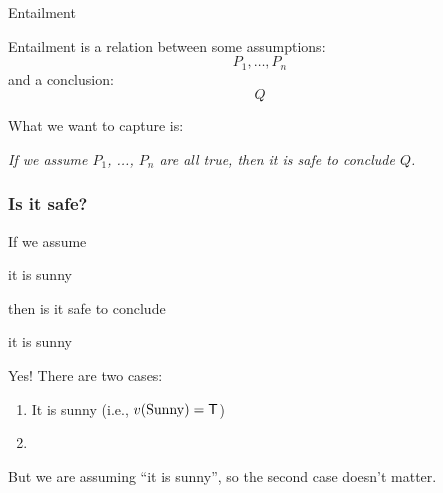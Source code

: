 \documentclass[xetex,aspectratio=169,14pt,hyperref={pdfpagelabels=true,pdflang={en-GB}}]{beamer}
\begin{document}
\frame{\titlepage}


\begin{frame}
  {Entailment}

  Entailment is a relation between some assumptions:
  \begin{displaymath}
    P_1, \dots, P_n
  \end{displaymath}
  and a conclusion:
  \begin{displaymath}
    Q
  \end{displaymath}

  \pause
  \bigskip

  What we want to capture is:

  \medskip

  \qquad \emph{If we assume $P_1$, ..., $P_n$ are all true, then it is safe to conclude $Q$.}


\end{frame}

\begin{frame}[t]
  \frametitle{Is it safe?}

  If we assume
  \begin{center}
    it is sunny
  \end{center}
  then is it safe to conclude
  \begin{center}
    it is sunny
  \end{center}

  \bigskip
  \pause

  Yes! \pause There are two cases:
  \begin{enumerate}
  \item It is sunny  (i.e., $v(\mathrm{Sunny}) = \mathsf{T}$)
  \item {}
  \end{enumerate}
  \pause But we are assuming ``it is sunny'', so the second case
  doesn't matter.
\end{frame}
\end{document}
